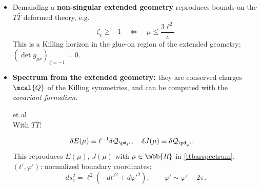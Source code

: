 \documentclass[10pt]{article}
\newcommand{\citations}[1]{{\footnotesize#1\par}}
\newcommand{\TTbar}{\texorpdfstring{\ensuremath{T\bar{T}}}{TTbar}\xspace}
\begin{document}
\begin{multicols}{3}
\begin{itemize}
%
%

\item Demanding a \textbf{non-singular extended geometry} reproduces bounds on the \TTbar deformed theory, e.g.
	\begin{equation}
		\zeta_c \ge -1 \quad \Leftrightarrow \quad\mu\le \frac{ 3\ell^2 }{c} \label{reality}
	\end{equation}
	This is a Killing horizon in the glue-on region of the \mbox{extended} geometry;
	$(\det g_{\mu\nu})_{\,\zeta = -1} = 0$.

\item \textbf{Spectrum from the extended geometry:} they are \mbox{conserved} charges $\mcal{Q}$ of the Killing symmetries, and can be computed with the \textit{covariant formalism}.

\citations{
	\textsl{\citeauthor{Iyer:1994ys,Barnich:2001jy}} et al\\
	With \TTbar: \textcite{Kraus:2021cwf}
}\vspace{-1.5\baselineskip}
	\begin{align*}
		\delta E(\mu) &\equiv  \ell^{-1} \delta \mathcal Q_{\pd_{t'}}, \quad \delta J(\mu) \equiv  \delta \mathcal Q_{\pd_{\varphi'}}.
	\end{align*}
	This reproduces $E(\mu)$, $J(\mu)$ with $\mu \in\mbb{R}$ in \eqref{ttbarspectrum}.\\
	$(t',\varphi')$: normalized boundary coordinates:
	\begin{equation}
		ds^2_c = \ell^2 ( -dt'^2 + d\varphi'^2) , \qquad \varphi' \sim \varphi' + 2\pi.\label{cutoffmetric}
	\end{equation}

\columnbreak

\vspace*{-8\baselineskip}


\end{itemize}
\end{multicols}
\end{document}
